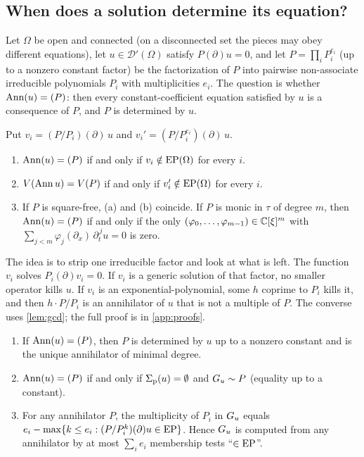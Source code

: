 \subsection{When does a solution determine its equation?}\label{sec:ident}
Let $\Omega$ be open and connected (on a disconnected set the pieces may obey different equations),
let $u\in\mathcal D'(\Omega)$ satisfy $P(\partial)u=0$, and let $P=\prod_iP_i^{e_i}$ (up to a nonzero constant factor) be the
factorization of $P$ into pairwise non-associate irreducible polynomials $P_i$ with multiplicities
$e_i$. The question is whether $\operatorname{Ann}(u)=(P)$: then every constant-coefficient equation satisfied by
$u$ is a consequence of $P$, and $P$ is determined by $u$.

\begin{theorem}\label{thm:ident}
Put $v_i=(P/P_i)(\partial)\,u$ and $v_i'=(P/P_i^{e_i})(\partial)\,u$.
\begin{enumerate}[label=(\alph*)]
  \item $\operatorname{Ann}(u)=(P)$ if and only if $v_i\notin\mathrm{EP}(\Omega)$ for every $i$.
  \item $V(\operatorname{Ann} u)=V(P)$ if and only if $v_i'\notin\mathrm{EP}(\Omega)$ for every $i$.
  \item If $P$ is square-free, (a) and (b) coincide. If $P$ is monic in $\tau$ of degree $m$, then
  $\operatorname{Ann}(u)=(P)$ if and only if the only $(\varphi_0,\dots,\varphi_{m-1})\in\mathbb{C}[\xi]^m$ with
  $\sum_{j<m}\varphi_j(\partial_x)\,\partial_t^{\,j}u=0$ is zero.
\end{enumerate}
\end{theorem}

The idea is to strip one irreducible factor and look at what is left. The function $v_i$ solves
$P_i(\partial)v_i=0$. If $v_i$ is a generic solution of that factor, no smaller operator kills $u$.
If $v_i$ is an exponential-polynomial, some $h$ coprime to $P_i$ kills it, and then
$h\cdot P/P_i$ is an annihilator of $u$ that is not a multiple of $P$. The converse uses
\cref{lem:gcd}; the full proof is in \cref{app:proofs}.

\begin{proposition}\label{prop:unique}
\begin{enumerate}[label=(\alph*)]
  \item If $\operatorname{Ann}(u)=(P)$, then $P$ is determined by $u$ up to a nonzero constant and is the unique
  annihilator of minimal degree.
  \item $\operatorname{Ann}(u)=(P)$ if and only if $\Sigma_{\mathrm p}(u)=\emptyset$ and $G_u\sim P$ (equality up to a constant).
  \item For any annihilator $P$, the multiplicity of $P_i$ in $G_u$ equals $e_i-\max\{k\le e_i:
  (P/P_i^{k})(\partial)u\in\mathrm{EP}\}$. Hence $G_u$ is computed from any annihilator by at most
  $\sum_ie_i$ membership tests ``$\in\mathrm{EP}$''.
\end{enumerate}
\end{proposition}

